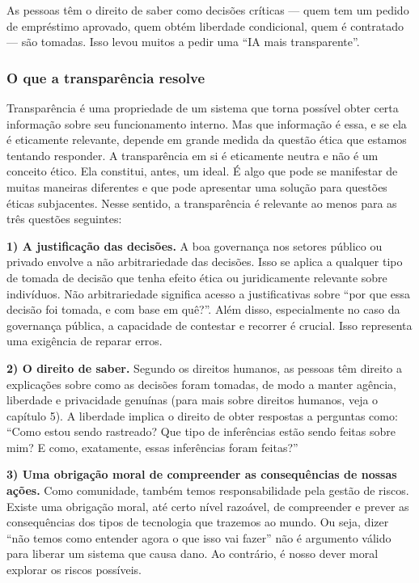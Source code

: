 \documentclass[
  11pt,
]{article}
\begin{document}
As pessoas têm o direito de saber como decisões críticas --- quem tem um
pedido de empréstimo aprovado, quem obtém liberdade condicional, quem é
contratado --- são tomadas. Isso levou muitos a pedir uma ``IA mais
transparente''.

\subsubsection{O que a transparência
resolve}\label{o-que-a-transparuxeancia-resolve}

Transparência é uma propriedade de um sistema que torna possível obter
certa informação sobre seu funcionamento interno. Mas que informação é
essa, e se ela é eticamente relevante, depende em grande medida da
questão ética que estamos tentando responder. A transparência em si é
eticamente neutra e não é um conceito ético. Ela constitui, antes, um
ideal. É algo que pode se manifestar de muitas maneiras diferentes e que
pode apresentar uma solução para questões éticas subjacentes. Nesse
sentido, a transparência é relevante ao menos para as três questões
seguintes:

\textbf{1) A justificação das decisões.} A boa governança nos setores
público ou privado envolve a não arbitrariedade das decisões. Isso se
aplica a qualquer tipo de tomada de decisão que tenha efeito ética ou
juridicamente relevante sobre indivíduos. Não arbitrariedade significa
acesso a justificativas sobre ``por que essa decisão foi tomada, e com
base em quê?''. Além disso, especialmente no caso da governança pública,
a capacidade de contestar e recorrer é crucial. Isso representa uma
exigência de reparar erros.

\textbf{2) O direito de saber.} Segundo os direitos humanos, as pessoas
têm direito a explicações sobre como as decisões foram tomadas, de modo
a manter agência, liberdade e privacidade genuínas (para mais sobre
direitos humanos, veja o capítulo 5). A liberdade implica o direito de
obter respostas a perguntas como: ``Como estou sendo rastreado? Que tipo
de inferências estão sendo feitas sobre mim? E como, exatamente, essas
inferências foram feitas?''

\textbf{3) Uma obrigação moral de compreender as consequências de nossas
ações.} Como comunidade, também temos responsabilidade pela gestão de
riscos. Existe uma obrigação moral, até certo nível razoável, de
compreender e prever as consequências dos tipos de tecnologia que
trazemos ao mundo. Ou seja, dizer ``não temos como entender agora o que
isso vai fazer'' não é argumento válido para liberar um sistema que
causa dano. Ao contrário, é nosso dever moral explorar os riscos
possíveis.
\end{document}
